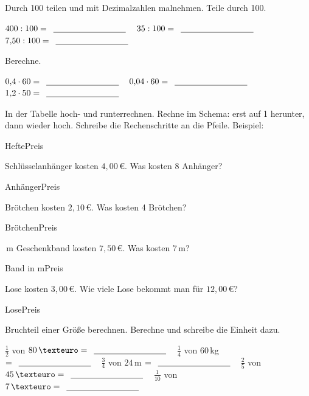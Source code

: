 \begin{aufgabe}{Durch 100 teilen und mit Dezimalzahlen malnehmen. Teile durch 100.}
\begin{teile}
\teil $400 : 100 = \leerfeld$
\teil $35 : 100 = \leerfeld$
\teil $7{,}50 : 100 = \leerfeld$
\end{teile}
Berechne.
\begin{teile}
\teil $0{,}4 \cdot 60 = \leerfeld$
\teil $0{,}04 \cdot 60 = \leerfeld$
\teil $1{,}2 \cdot 50 = \leerfeld$
\end{teile}
\end{aufgabe}

\begin{aufgabe}{In der Tabelle hoch- und runterrechnen. Rechne im Schema: erst auf 1 herunter, dann wieder hoch. Schreibe die Rechenschritte an die Pfeile.}
Beispiel:
\begin{dreisatz}{Hefte}{Preis}
\end{dreisatz}
\begin{teile}
 Schlüsselanhänger kosten $4{,}00\,€$. Was kosten 8 Anhänger?
\begin{dreisatz}{Anhänger}{Preis}
\dsp{\phantom{:00}}{\phantom{:00}}
\dsp{\phantom{:00}}{\phantom{:00}}
\end{dreisatz}
 Brötchen kosten $2{,}10\,€$. Was kosten 4 Brötchen?
\begin{dreisatz}{Brötchen}{Preis}
\dsp{\phantom{:00}}{\phantom{:00}}
\dsp{\phantom{:00}}{\phantom{:00}}
\end{dreisatz}
\,m Geschenkband kosten $7{,}50\,€$. Was kosten 7\,m?
\begin{dreisatz}{Band in m}{Preis}
\dsp{\phantom{:00}}{\phantom{:00}}
\dsp{\phantom{:00}}{\phantom{:00}}
\end{dreisatz}
 Lose kosten $3{,}00\,€$. Wie viele Lose bekommt man für $12{,}00\,€$?
\begin{dreisatz}{Lose}{Preis}
\dsp{\phantom{:00}}{\phantom{:00}}
\dsp{\phantom{:00}}{\phantom{:00}}
\end{dreisatz}
\end{teile}
\end{aufgabe}

\begin{aufgabe}{Bruchteil einer Größe berechnen. Berechne und schreibe die Einheit dazu.}
\begin{teile}
\teil $\frac{1}{2}$ von $80\,€ = \leerfeld$
\teil $\frac{1}{4}$ von $60\,$kg $= \leerfeld$
\teil $\frac{3}{4}$ von $24\,$m $= \leerfeld$
\teil $\frac{2}{5}$ von $45\,€ = \leerfeld$
\teil $\frac{1}{10}$ von $7\,€ = \leerfeld$
\end{teile}
\end{aufgabe}

